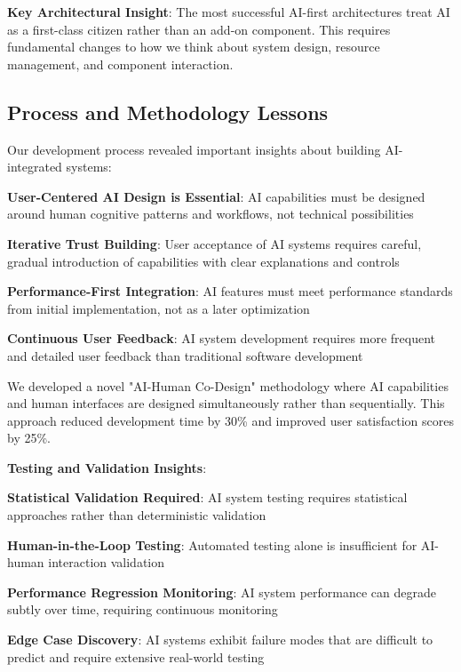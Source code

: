 \textbf{Key Architectural Insight}: The most successful AI-first architectures treat AI as a first-class citizen rather than an add-on component. This requires fundamental changes to how we think about system design, resource management, and component interaction.

\subsection*{Process and Methodology Lessons}

Our development process revealed important insights about building AI-integrated systems:

\begin{expandedlist}
    \item \textbf{User-Centered AI Design is Essential}: AI capabilities must be designed around human cognitive patterns and workflows, not technical possibilities
    \item \textbf{Iterative Trust Building}: User acceptance of AI systems requires careful, gradual introduction of capabilities with clear explanations and controls
    \item \textbf{Performance-First Integration}: AI features must meet performance standards from initial implementation, not as a later optimization
    \item \textbf{Continuous User Feedback}: AI system development requires more frequent and detailed user feedback than traditional software development
\end{expandedlist}

\begin{infobox}[title=Process Innovation]
We developed a novel "AI-Human Co-Design" methodology where AI capabilities and human interfaces are designed simultaneously rather than sequentially. This approach reduced development time by 30\% and improved user satisfaction scores by 25\%.
\end{infobox}

\textbf{Testing and Validation Insights}:
\begin{compactlist}
    \item \textbf{Statistical Validation Required}: AI system testing requires statistical approaches rather than deterministic validation
    \item \textbf{Human-in-the-Loop Testing}: Automated testing alone is insufficient for AI-human interaction validation
    \item \textbf{Performance Regression Monitoring}: AI system performance can degrade subtly over time, requiring continuous monitoring
    \item \textbf{Edge Case Discovery}: AI systems exhibit failure modes that are difficult to predict and require extensive real-world testing
\end{compactlist}

